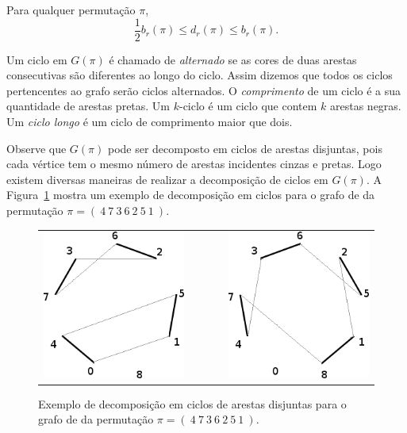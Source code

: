 \begin{teo}
\label{teo:rev_bkp_bound}
Para qualquer permutação $\pi$, 
\[\frac{1}{2} b_r(\pi) \leq d_r(\pi) \leq
  b_r(\pi).
\]
\end{teo}

Um ciclo em $G(\pi)$ é chamado de \textit{alternado} se as cores de
duas arestas consecutivas são diferentes ao longo do ciclo. Assim
dizemos que todos os ciclos pertencentes ao grafo serão ciclos
alternados. O \textit{comprimento} de um ciclo é a sua quantidade de
arestas pretas. Um $k$-ciclo é um ciclo que contem $k$ arestas
negras. Um \textit{ciclo longo} é um ciclo de comprimento maior que
dois.

Observe que $G(\pi)$ pode ser decomposto em ciclos de arestas
disjuntas, pois cada vértice tem o mesmo número de arestas incidentes
cinzas e pretas. Logo existem diversas maneiras de realizar a
decomposição de ciclos em $G(\pi)$. A
Figura~\ref{fig:rev_grafo_bkp_dec2cic} mostra um exemplo de
decomposição em ciclos para o grafo de \bkp{} da permutação $\pi =
(~4~7~3~6~2~5~1~)$.

\begin{figure}[h]
  \centering 
  \begin{tabular}{ccc} 
  \includegraphics[scale=0.6]{images/rev_grafo_bkp_dec2cic-1.png}
  & ~~~~
  & \includegraphics[scale=0.6]{images/rev_grafo_bkp_dec2cic-2.png} 
  \end{tabular} 
  \caption{Exemplo de decomposição em ciclos de arestas disjuntas para
  o grafo de \bkp{} da permutação $\pi = (~4~7~3~6~2~5~1~)$.}
  \label{fig:rev_grafo_bkp_dec2cic}
\end{figure}

